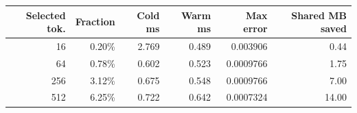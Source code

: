 \begin{tabular}{rrrrrr}
\toprule
Selected tok. & Fraction & Cold ms & Warm ms & Max error & Shared MB saved \\
\midrule
16 & 0.20\% & 2.769 & 0.489 & 0.003906 & 0.44 \\
64 & 0.78\% & 0.602 & 0.523 & 0.0009766 & 1.75 \\
256 & 3.12\% & 0.675 & 0.548 & 0.0009766 & 7.00 \\
512 & 6.25\% & 0.722 & 0.642 & 0.0007324 & 14.00 \\
\bottomrule
\end{tabular}
